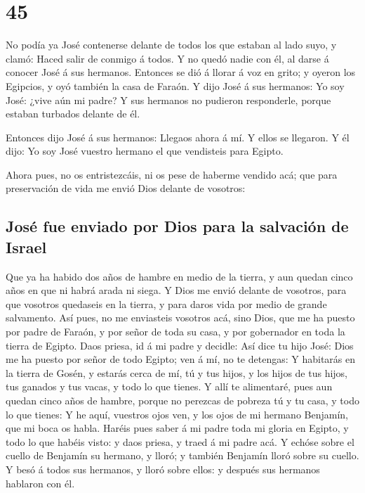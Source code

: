 \hypertarget{section-01-45}{%
\section{45}\label{section-01-45}}

 No podía ya José contenerse delante de todos los que
estaban al lado suyo, y clamó: Haced salir de conmigo á todos. Y no
quedó nadie con él, al darse á conocer José á sus hermanos.
 Entonces se dió á llorar á voz en grito; y oyeron los
Egipcios, y oyó también la casa de Faraón.  Y dijo José á
sus hermanos: Yo soy José: ¿vive aún mi padre? Y sus hermanos no
pudieron responderle, porque estaban turbados delante de él.

 Entonces dijo José á sus hermanos: Llegaos ahora á mí. Y
ellos se llegaron. Y él dijo: Yo soy José vuestro hermano el que
vendisteis para Egipto.

 Ahora pues, no os entristezcáis, ni os pese de haberme
vendido acá; que para preservación de vida me envió Dios delante de
vosotros:

\hypertarget{josuxe9-fue-enviado-por-dios-para-la-salvaciuxf3n-de-israel}{%
\subsection{José fue enviado por Dios para la salvación de
Israel}\label{josuxe9-fue-enviado-por-dios-para-la-salvaciuxf3n-de-israel}}

 Que ya ha habido dos años de hambre en medio de la
tierra, y aun quedan cinco años en que ni habrá arada ni siega.
 Y Dios me envió delante de vosotros, para que vosotros
quedaseis en la tierra, y para daros vida por medio de grande
salvamento.  Así pues, no me enviasteis vosotros acá, sino
Dios, que me ha puesto por padre de Faraón, y por señor de toda su casa,
y por gobernador en toda la tierra de Egipto.  Daos
priesa, id á mi padre y decidle: Así dice tu hijo José: Dios me ha
puesto por señor de todo Egipto; ven á mí, no te detengas:
 Y habitarás en la tierra de Gosén, y estarás cerca de
mí, tú y tus hijos, y los hijos de tus hijos, tus ganados y tus vacas, y
todo lo que tienes.  Y allí te alimentaré, pues aun
quedan cinco años de hambre, porque no perezcas de pobreza tú y tu casa,
y todo lo que tienes:  Y he aquí, vuestros ojos ven, y
los ojos de mi hermano Benjamín, que mi boca os habla. 
Haréis pues saber á mi padre toda mi gloria en Egipto, y todo lo que
habéis visto: y daos priesa, y traed á mi padre acá.  Y
echóse sobre el cuello de Benjamín su hermano, y lloró; y también
Benjamín lloró sobre su cuello.  Y besó á todos sus
hermanos, y lloró sobre ellos: y después sus hermanos hablaron con él.

